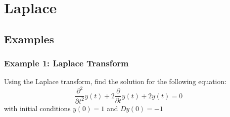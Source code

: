 \section{Laplace}
\subsection{Examples}
\subsubsection{Example 1: Laplace Transform}
Using the Laplace transform, find the solution for the following equation:
$$\frac{\partial^{2}}{\partial t^{2}}y(t)+2\frac{\partial}{\partial t}y(t)+2y(t)=0$$
with initial conditions $y (0) = 1$ and $Dy (0) = -1$


